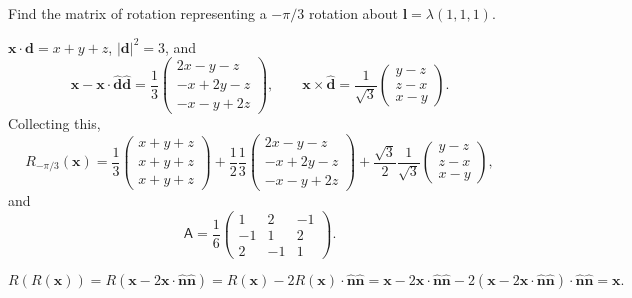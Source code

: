 \documentclass[10pt,notitlepage]{revtex4-1}
\newenvironment{example}[1][Example]{\begin{trivlist}
\item[\hskip \labelsep {\bfseries #1}]}{\end{trivlist}}
\newcommand{\xb}{\boldsymbol{x}}
\newcommand{\db}{{\boldsymbol{d}}}
\newcommand{\lb}{{\boldsymbol{l}}}
\newcommand{\nb}{{\boldsymbol{n}}}
\begin{document}
\begin{example}
	Find the matrix of rotation representing a $-\pi/3$ rotation about
	$\lb=\lambda(1,1,1)$.
	
	$\xb\cdot\db=x+y+z$, $|\db|^2=3$, and
	\begin{equation}
		\xb-\xb\cdot\hat{\db}\hat{\db}
		=\frac{1}{3}\begin{pmatrix}2x-y-z\\-x+2y-z\\-x-y+2z\end{pmatrix},\qquad
		\xb\times\hat{\db}
		=\frac{1}{\sqrt{3}}\begin{pmatrix}y-z\\z-x\\x-y\end{pmatrix}.
	\end{equation}
	Collecting this,
	\begin{equation}
		R_{-\pi/3}(\xb)
		=\frac{1}{3}\begin{pmatrix}x+y+z\\x+y+z\\x+y+z\end{pmatrix}+
		\frac{1}{2}\frac{1}{3}
		\begin{pmatrix}2x-y-z\\-x+2y-z\\-x-y+2z\end{pmatrix}
		+\frac{\sqrt{3}}{2}\frac{1}{\sqrt{3}}
		\begin{pmatrix}y-z\\z-x\\x-y\end{pmatrix},
	\end{equation}
	and
	\begin{equation}
		\mathsf{A}=\frac{1}{6}\begin{pmatrix}1 & 2 & -1\\
		-1 & 1 & 2\\2 & -1 & 1\end{pmatrix}.
	\end{equation}
\end{example}

\begin{example}
	\begin{equation}
		R(R(\xb))=R(\xb-2\xb\cdot\hat{\nb}\hat{\nb})
		=R(\xb)-2R(\xb)\cdot\hat{\nb}\hat{\nb}
		=\xb-2\xb\cdot\hat{\nb}\hat{\nb}
		-2(\xb-2\xb\cdot\hat{\nb}\hat{\nb})\cdot\hat{\nb}\hat{\nb}
		=\xb.
	\end{equation}
\end{example}
\end{document}
